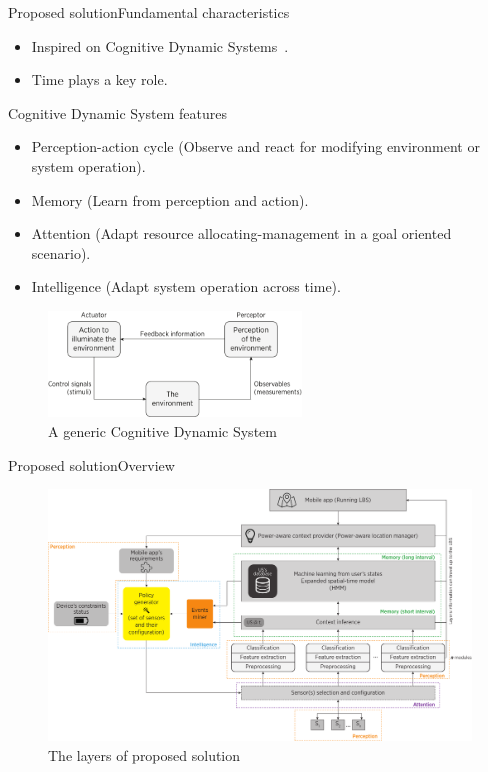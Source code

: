 \documentclass[8pt,xcolor={dvipsnames},handout]{beamer}
\begin{document}
\begin{frame}{Proposed solution}{Fundamental characteristics}
\begin{itemize}
  \item Inspired on Cognitive Dynamic Systems~\cite{Haykin2006}.
  \item Time plays a key role.
\end{itemize}

\begin{exampleblock}{Cognitive Dynamic System features}
\begin{itemize}
    \item Perception-action cycle (Observe and react for modifying environment or system operation).
    \pause
    \item Memory (Learn from perception and action).
    \pause
    \item Attention (Adapt resource allocating-management in a goal oriented scenario).
    \pause
    \item Intelligence (Adapt system operation across time).
  \end{itemize}
\end{exampleblock}

\begin{figure}
  \centering
  \includegraphics[width=0.6\textwidth]{vectors/cds-generic}
  \caption{A generic Cognitive Dynamic System}
  \label{fig:cds-generic}
\end{figure}
\end{frame}

\begin{frame}{Proposed solution}{Overview}
\begin{figure}
  \centering
  \includegraphics[width=\textwidth]{vectors/solution-general-overview}
  \caption{The layers of proposed solution}
  \label{fig:solution}
\end{figure}
\end{frame}
\end{document}
